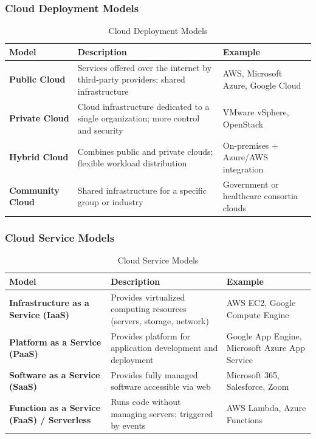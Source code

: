 \subsubsection{Cloud Deployment Models}

\begin{table}[htbp]
\centering
\renewcommand{\arraystretch}{1.3}
\begin{tabular}{|p{3.2cm}|p{7cm}|p{4.5cm}|}
\hline
\textbf{Model} & \textbf{Description} & \textbf{Example} \\
\hline

\textbf{Public Cloud} &
Services offered over the internet by third-party providers; shared infrastructure &
AWS, Microsoft Azure, Google Cloud \\
\hline

\textbf{Private Cloud} &
Cloud infrastructure dedicated to a single organization; more control and security &
VMware vSphere, OpenStack \\
\hline

\textbf{Hybrid Cloud} &
Combines public and private clouds; flexible workload distribution &
On-premises + Azure/AWS integration \\
\hline

\textbf{Community Cloud} &
Shared infrastructure for a specific group or industry &
Government or healthcare consortia clouds \\
\hline

\end{tabular}
\caption{Cloud Deployment Models}
\end{table}

\subsubsection{Cloud Service Models}

\begin{table}[htbp]
\centering
\renewcommand{\arraystretch}{1.3}
\begin{tabular}{|p{4cm}|p{7.2cm}|p{4cm}|}
\hline
\textbf{Model} & \textbf{Description} & \textbf{Example} \\
\hline

\textbf{Infrastructure as a Service (IaaS)} &
Provides virtualized computing resources (servers, storage, network) &
AWS EC2, Google Compute Engine \\
\hline

\textbf{Platform as a Service (PaaS)} &
Provides platform for application development and deployment &
Google App Engine, Microsoft Azure App Service \\
\hline

\textbf{Software as a Service (SaaS)} &
Provides fully managed software accessible via web &
Microsoft 365, Salesforce, Zoom \\
\hline

\textbf{Function as a Service (FaaS) / Serverless} &
Runs code without managing servers; triggered by events &
AWS Lambda, Azure Functions \\
\hline

\end{tabular}
\caption{Cloud Service Models}
\end{table}

